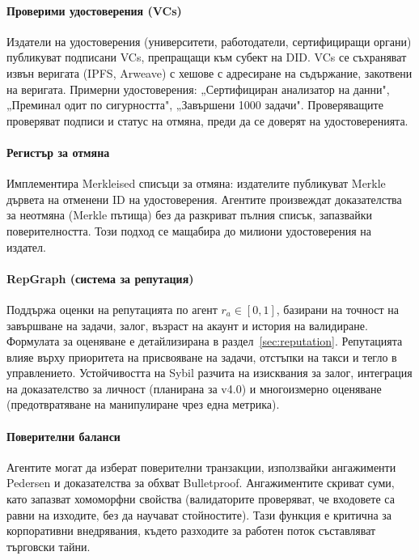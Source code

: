 \documentclass[11pt]{article}
\begin{document}
\paragraph{Проверими удостоверения (VCs)} Издатели на удостоверения (университети, работодатели, сертифициращи органи) публикуват подписани VCs, препращащи към субект на DID. VCs се съхраняват извън веригата (IPFS, Arweave) с хешове с адресиране на съдържание, закотвени на веригата. Примерни удостоверения: „Сертифициран анализатор на данни", „Преминал одит по сигурността", „Завършени 1000 задачи". Проверяващите проверяват подписи и статус на отмяна, преди да се доверят на удостоверенията.

\paragraph{Регистър за отмяна} Имплементира Merkleised списъци за отмяна: издателите публикуват Merkle дървета на отменени ID на удостоверения. Агентите произвеждат доказателства за неотмяна (Merkle пътища) без да разкриват пълния списък, запазвайки поверителността. Този подход се мащабира до милиони удостоверения на издател.

\paragraph{RepGraph (система за репутация)} Поддържа оценки на репутацията по агент $r_a \in [0,1]$, базирани на точност на завършване на задачи, залог, възраст на акаунт и история на валидиране. Формулата за оценяване е детайлизирана в раздел~\ref{sec:reputation}. Репутацията влияе върху приоритета на присвояване на задачи, отстъпки на такси и тегло в управлението. Устойчивостта на Sybil разчита на изисквания за залог, интеграция на доказателство за личност (планирана за v4.0) и многоизмерно оценяване (предотвратяване на манипулиране чрез една метрика).

\paragraph{Поверителни баланси} Агентите могат да изберат поверителни транзакции, използвайки ангажименти Pedersen и доказателства за обхват Bulletproof. Ангажиментите скриват суми, като запазват хомоморфни свойства (валидаторите проверяват, че входовете са равни на изходите, без да научават стойностите). Тази функция е критична за корпоративни внедрявания, където разходите за работен поток съставляват търговски тайни.
\end{document}
